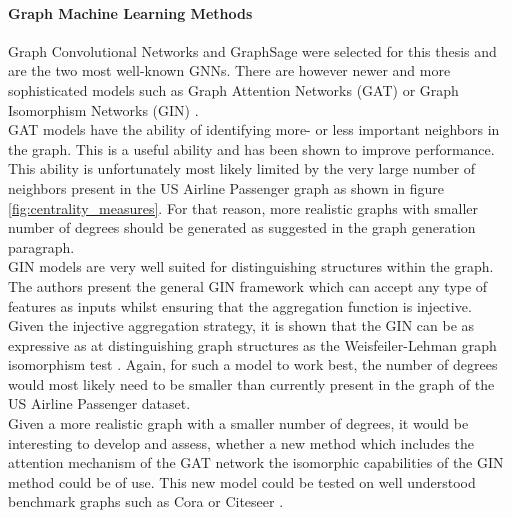   \paragraph{Graph Machine Learning Methods}\mbox{}

  \noindent Graph Convolutional Networks and GraphSage were selected for this
  thesis and are the two most well-known GNNs. There are however newer and more
  sophisticated models such as Graph Attention Networks (GAT) 
  \citep{velivckovic2018graph} or Graph Isomorphism Networks (GIN) 
  \citep{xu2019powerful}. \\

  \noindent GAT models have the ability of identifying more- or 
  less important neighbors in the graph. This is a useful ability and has been 
  shown to improve performance. This ability is unfortunately most likely 
  limited by the very large number of neighbors present in the US Airline 
  Passenger graph as shown in figure \ref{fig:centrality_measures}. For that
  reason, more realistic graphs with smaller number of degrees should be
  generated as suggested in the graph generation paragraph. \\

  \noindent GIN models are very well suited for distinguishing structures 
  within the graph. The authors \cite{xu2019powerful} present the general GIN
  framework which can accept any type of features as inputs whilst ensuring
  that the aggregation function is injective. Given the injective aggregation
  strategy, it is shown that the GIN can be as expressive as at distinguishing
  graph structures as the Weisfeiler-Lehman graph isomorphism test 
  \citep{weisfeiler1968}. Again, for such a model to work best, the number of
  degrees would most likely need to be smaller than currently present in the
  graph of the US Airline Passenger dataset. \\

  \noindent Given a more realistic graph with a smaller number of degrees, it
  would be interesting to develop and assess, whether a new method which
  includes the attention mechanism of the GAT network the isomorphic 
  capabilities of the GIN method could be of use. This new model could be
  tested on well understood benchmark graphs such as Cora
  \citep{mccallum2000automating} or Citeseer \citep{giles1998citeseer}. 

